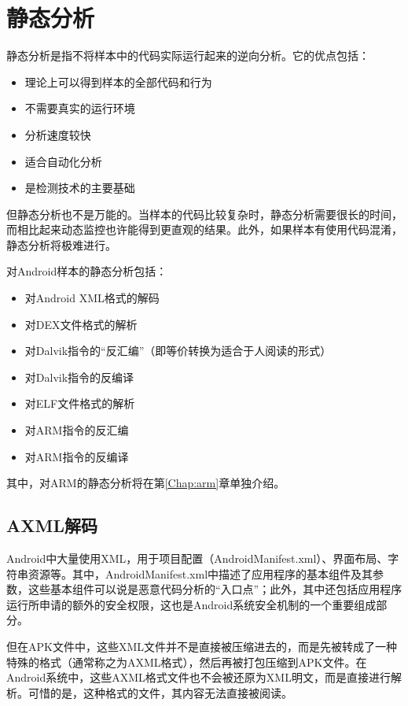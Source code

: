 \chapter{静态分析}
静态分析是指不将样本中的代码实际运行起来的逆向分析。它的优点包括：
\begin{itemize}
  \item 理论上可以得到样本的全部代码和行为
  \item 不需要真实的运行环境
  \item 分析速度较快
  \item 适合自动化分析
  \item 是检测技术的主要基础
\end{itemize}

但静态分析也不是万能的。当样本的代码比较复杂时，静态分析需要很长的时间，而相比起来动态监控也许能得到更直观的结果。此外，如果样本有使用代码混淆，静态分析将极难进行。

对Android样本的静态分析包括：
\begin{itemize}
  \item 对Android XML格式的解码
  \item 对DEX文件格式的解析
  \item 对Dalvik指令的“反汇编”（即等价转换为适合于人阅读的形式）
  \item 对Dalvik指令的反编译
  \item 对ELF文件格式的解析
  \item 对ARM指令的反汇编
  \item 对ARM指令的反编译
\end{itemize}

其中，对ARM的静态分析将在第\ref{Chap:arm}章单独介绍。

\section{AXML解码}
\label{Sec:xml-decode}
Android中大量使用XML，用于项目配置（AndroidManifest.xml）、界面布局、字符串资源等。其中，AndroidManifest.xml中描述了应用程序的基本组件及其参数，这些基本组件可以说是恶意代码分析的“入口点”；此外，其中还包括应用程序运行所申请的额外的安全权限，这也是Android系统安全机制的一个重要组成部分。

但在APK文件中，这些XML文件并不是直接被压缩进去的，而是先被转成了一种特殊的格式（通常称之为AXML格式），然后再被打包压缩到APK文件。在Android系统中，这些AXML格式文件也不会被还原为XML明文，而是直接进行解析。可惜的是，这种格式的文件，其内容无法直接被阅读。

